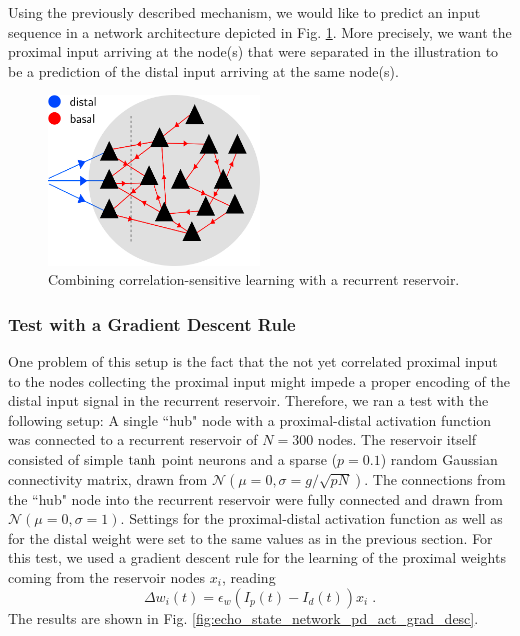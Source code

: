 \documentclass[10pt,a4paper]{article}
\begin{document}
Using the previously described mechanism, we would like to predict an input sequence in a network architecture depicted in Fig. \ref{fig:prox_dist_recurrent}. More precisely, we want the proximal input arriving at the node(s) that were separated in the illustration to be a prediction of the distal input arriving at the same node(s).
\begin{figure}
\centering
\includegraphics[width=0.5\textwidth]{./figures/prox_dist_rnn_illustration.png}
\caption{Combining correlation-sensitive learning with a recurrent reservoir.}
\label{fig:prox_dist_recurrent}
\end{figure}


\subsubsection{Test with a Gradient Descent Rule}
One problem of this setup is the fact that the not yet correlated proximal input to the nodes collecting the proximal input might impede a proper encoding of the distal input signal in the recurrent reservoir. Therefore, we ran a test with the following setup: A single ``hub" node with a proximal-distal activation function was connected to a recurrent reservoir of $N=300$ nodes. The reservoir itself consisted of simple $\rm tanh$ point neurons and a sparse ($p=0.1$) random Gaussian connectivity matrix, drawn from $\mathcal{N}(\mu=0,\sigma=g/\sqrt{pN})$. The connections from the ``hub" node into the recurrent reservoir were fully connected and drawn from $\mathcal{N}(\mu=0,\sigma=1)$. Settings for the proximal-distal activation function as well as for the distal weight were set to the same values as in the previous section. For this test, we used a gradient descent rule for the learning of the proximal weights coming from the reservoir nodes $x_i$, reading
\begin{equation}
\Delta w_i(t) = \epsilon_w \left(I_p(t)-I_d(t)\right) x_i \;.
\end{equation}
The results are shown in Fig. \ref{fig:echo_state_network_pd_act_grad_desc}.
\end{document}
